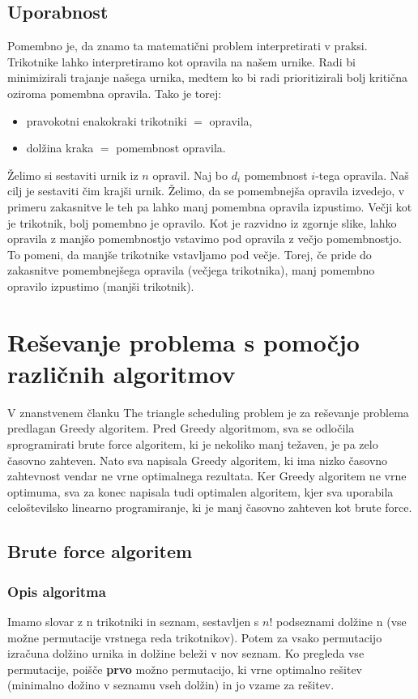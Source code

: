 \documentclass[a4paper,12pt]{article}
\theoremstyle{definition}
\theoremstyle{plain}
\begin{document}
\subsection{Uporabnost}
Pomembno je, da znamo ta matematični problem interpretirati v praksi. Trikotnike lahko interpretiramo kot opravila na našem urnike. Radi bi minimizirali trajanje našega urnika, medtem ko bi radi prioritizirali bolj kritična oziroma pomembna opravila.
Tako je torej:
\begin{itemize}
    \item pravokotni enakokraki trikotniki $=$ opravila,
    \item dolžina kraka $=$ pomembnost opravila.
\end{itemize}

Želimo si sestaviti urnik iz $n$ opravil. Naj bo $d_i$ pomembnost $i$-tega opravila. Naš cilj je sestaviti čim krajši urnik. Želimo, da se pomembnejša opravila izvedejo, v primeru zakasnitve le teh pa lahko manj pomembna opravila izpustimo.
Večji kot je trikotnik, bolj pomembno je opravilo. Kot je razvidno iz zgornje slike, lahko opravila z manjšo pomembnostjo vstavimo pod opravila z večjo pomembnostjo. To pomeni, da manjše trikotnike vstavljamo pod večje. Torej, če pride do zakasnitve
pomembnejšega opravila (večjega trikotnika), manj pomembno opravilo  izpustimo (manjši trikotnik).


\section{Reševanje problema s pomočjo različnih algoritmov}
V znanstvenem članku The triangle scheduling problem \cite{triangle} je za reševanje problema predlagan Greedy algoritem. Pred Greedy algoritmom, sva se odločila sprogramirati brute force algoritem, ki je nekoliko manj težaven, je pa zelo časovno zahteven. 
Nato sva napisala Greedy algoritem, ki ima nizko časovno zahtevnost vendar ne vrne optimalnega rezultata. Ker Greedy algoritem ne vrne optimuma, sva za konec napisala tudi optimalen algoritem, kjer sva uporabila celoštevilsko linearno programiranje, ki je manj časovno zahteven kot brute force.


\subsection{Brute force algoritem}
\subsubsection{Opis algoritma}
Imamo slovar z n trikotniki in seznam, sestavljen s $n!$ podseznami dolžine n
(vse možne permutacije vrstnega reda trikotnikov). Potem za vsako permutacijo izračuna dolžino urnika in 
dolžine beleži v nov seznam. Ko pregleda vse permutacije, poišče \textbf{prvo} možno permutacijo, ki vrne optimalno rešitev
(minimalno dožino v seznamu vseh dolžin) in jo vzame za rešitev.
\end{document}
